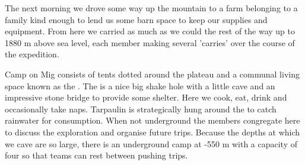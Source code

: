 

The next morning we drove some way up the mountain to a farm belonging to a family kind enough
to lend us some barn space to keep our supplies and equipment. From here we carried as much as we
could the rest of the way up  to 1880 m above sea level, each member making several 'carries'
over the course of the expedition.


Camp on Mig consists of tents dotted around the plateau and a communal living space known as
the . The  is a nice big shake hole with a little cave and an impressive stone bridge to provide
some shelter. Here we cook, eat, drink and occasionally take naps. Tarpaulin is strategically hung
around the  to catch rainwater for consumption. When not underground the members congregate
here to discuss the exploration and organise future trips. Because the depths at which we cave
are so large, there is an underground camp at -550 m with a capacity of four so that teams can rest
between pushing trips.


